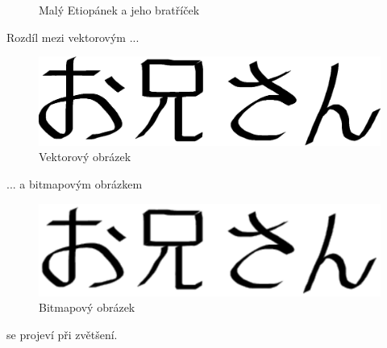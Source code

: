 \documentclass[a4paper,11pt]{article}
\begin{document}
\begin{figure}[H]
{		}
		\caption{Malý Etiopánek a jeho bratříček}
		\label{picEtiopan}
	\end{figure}
	\newpage
	\noindent
	Rozdíl mezi vektorovým ...
	\begin{figure}[H]
		\centering
		\includegraphics[scale=0.4]{oniisan}	
		\caption{Vektorový obrázek}
		\label{picVector}
	\end{figure}
	\noindent
	... a bitmapovým obrázkem
	\begin{figure}[H]
		\centering
		\includegraphics[scale=0.6]{oniisan2}	
		\caption{Bitmapový obrázek}
		\label{picBitmap}
	\end{figure}
	\noindent
	se projeví při zvětšení.
	
\end{document}
